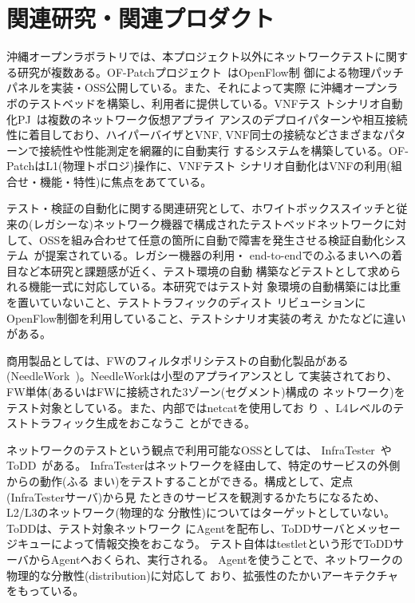  \section{関連研究・関連プロダクト}
 \label{sec:related-research}

沖縄オープンラボラトリでは、本プロジェクト以外にネットワークテストに関す
る研究が複数ある。OF-Patchプロジェクト~\cite{ool-testbedpj}はOpenFlow制
御による物理パッチパネルを実装・OSS公開している。また、それによって実際
に沖縄オープンラボのテストベッドを構築し、利用者に提供している。VNFテス
トシナリオ自動化PJ~\cite{ool-vnftestpj}は複数のネットワーク仮想アプライ
アンスのデプロイパターンや相互接続性に着目しており、ハイパーバイザとVNF,
VNF同士の接続などさまざまなパターンで接続性や性能測定を網羅的に自動実行
するシステムを構築している。OF-PatchはL1(物理トポロジ)操作に、VNFテスト
シナリオ自動化はVNFの利用(組合せ・機能・特性)に焦点をあてている。

テスト・検証の自動化に関する関連研究として、ホワイトボックススイッチと従
来の(レガシーな)ネットワーク機器で構成されたテストベッドネットワークに対
して、OSSを組み合わせて任意の箇所に自動で障害を発生させる検証自動化シス
テム~\cite{wbsw-oss-test-automation}が提案されている。レガシー機器の利用・
end-to-endでのふるまいへの着目など本研究と課題感が近く、テスト環境の自動
構築などテストとして求められる機能一式に対応している。本研究ではテスト対
象環境の自動構築には比重を置いていないこと、テストトラフィックのディスト
リビューションにOpenFlow制御を利用していること、テストシナリオ実装の考え
かたなどに違いがある。

商用製品としては、FWのフィルタポリシテストの自動化製品がある
(NeedleWork~\cite{needlework-web})。NeedleWorkは小型のアプライアンスとし
て実装されており、FW単体(あるいはFWに接続された3ゾーン(セグメント)構成の
ネットワーク)をテスト対象としている。また、内部ではnetcatを使用してお
り~\cite{needlework-slide}、L4レベルのテストトラフィック生成をおこなうこ
とができる。

ネットワークのテストという観点で利用可能なOSSとしては、
InfraTester~\cite{infratester-github}やToDD~\cite{todd-github}がある。
InfraTesterはネットワークを経由して、特定のサービスの外側からの動作(ふる
まい)をテストすることができる。構成として、定点(InfraTesterサーバ)から見
たときのサービスを観測するかたちになるため、L2/L3のネットワーク(物理的な
分散性)についてはターゲットとしていない。ToDDは、テスト対象ネットワーク
にAgentを配布し、ToDDサーバとメッセージキューによって情報交換をおこなう。
テスト自体はtestletという形でToDDサーバからAgentへおくられ、実行される。
Agentを使うことで、ネットワークの物理的な分散性(distribution)に対応して
おり、拡張性のたかいアーキテクチャをもっている。


